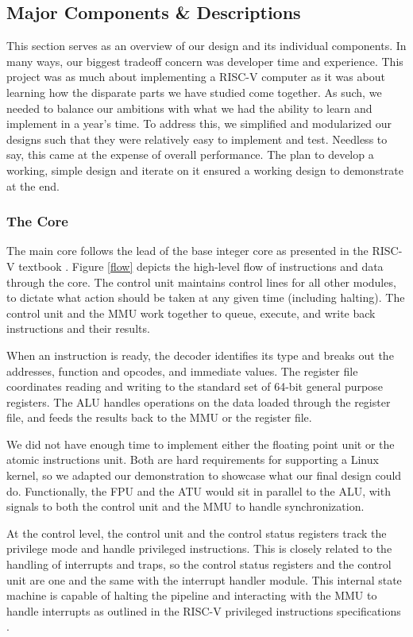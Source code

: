 \documentclass{article}
\begin{document}
\subsection{Major Components \& Descriptions}
    This section serves as an overview of our design and its individual components.  In many ways, our biggest tradeoff concern was developer time and experience.  This project was as much about implementing a RISC-V computer as it was about learning how the disparate parts we have studied come together.  As such, we needed to balance our ambitions with what we had the ability to learn and implement in a year's time.  To address this, we simplified and modularized our designs such that they were relatively easy to implement and test.  Needless to say, this came at the expense of overall performance.  The plan to develop a working, simple design and iterate on it ensured a working design to demonstrate at the end.
    
    \subsubsection{The Core}
    The main core follows the lead of the base integer core as presented in the RISC-V textbook \cite{RISCV_TEXT}.  Figure \ref{flow} depicts the high-level flow of instructions and data through the core.  The control unit maintains control lines for all other modules, to dictate what action should be taken at any given time (including halting).  The control unit and the MMU work together to queue, execute, and write back instructions and their results.
    
    When an instruction is ready, the decoder identifies its type and breaks out the addresses, function and opcodes, and immediate values.  The register file coordinates reading and writing to the standard set of 64-bit general purpose registers.  The ALU handles operations on the data loaded through the register file, and feeds the results back to the MMU or the register file.

    We did not have enough time to implement either the floating point unit or the atomic instructions unit.  Both are hard requirements for supporting a Linux kernel, so we adapted our demonstration to showcase what our final design could do.  Functionally, the FPU and the ATU would sit in parallel to the ALU, with signals to both the control unit and the MMU to handle synchronization.
    
    At the control level, the control unit and the control status registers track the privilege mode and handle privileged instructions.  This is closely related to the handling of interrupts and traps, so the control status registers and the control unit are one and the same with the interrupt handler module.  This internal state machine is capable of halting the pipeline and interacting with the MMU to handle interrupts as outlined in the RISC-V privileged instructions specifications \cite{RISCV_PRIV}.
    
\end{document}
